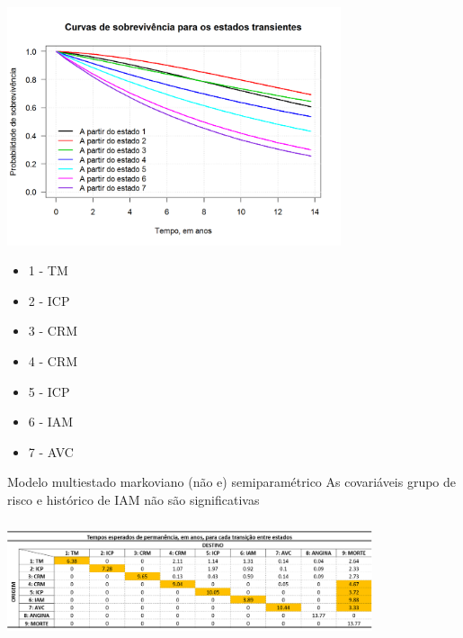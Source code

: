 \begin{frame}

\vspace{-.2cm}\begin{center}
 \includegraphics*[height = 7cm]{mass_msm.png}
\end{center}

\vspace{-.6cm}

\tiny

\begin{multicols}{4}
 \begin{itemize}
  \item 1 - TM
  \item 2 - ICP
  \item 3 - CRM
  \item 4 - CRM
  \item 5 - ICP
  \item 6 - IAM
  \item 7 - AVC
 \end{itemize}
\end{multicols}

\end{frame}

\begin{frame}

\begin{block}{Modelo multiestado markoviano (não e) semiparamétrico}
\small As covariáveis grupo de risco e histórico de IAM não são 
       significativas
\end{block}

\vspace{.5cm}\begin{center}
 \includegraphics*[height=3.5cm, width=10.75cm]{times_mass_mstate.png}
\end{center}

\end{frame}

